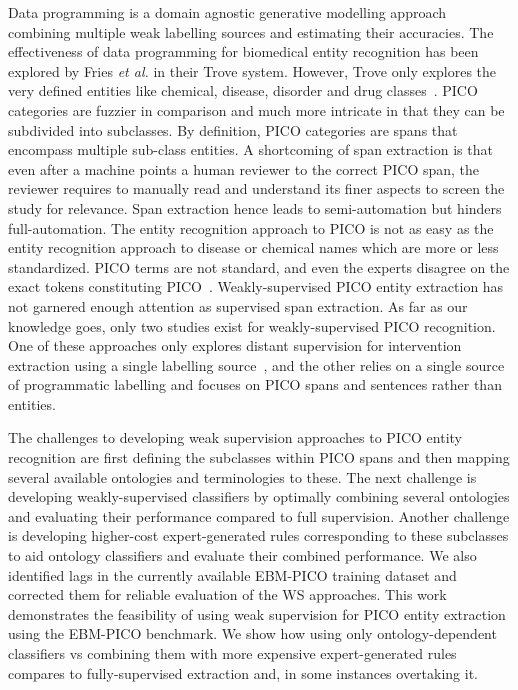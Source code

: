 \documentclass[10.7pt,]{article}
\begin{document}
Data programming is a domain agnostic generative modelling approach combining multiple weak labelling sources and estimating their accuracies.
The effectiveness of data programming for biomedical entity recognition has been explored by Fries \textit{et al.} in their Trove system.
However, Trove only explores the very defined entities like chemical, disease, disorder and drug classes~\cite{fries2021ontology}. 
PICO categories are fuzzier in comparison and much more intricate in that they can be subdivided into subclasses.
By definition, PICO categories are spans that encompass multiple sub-class entities.
A shortcoming of span extraction is that even after a machine points a human reviewer to the correct PICO span, the reviewer requires to manually read and understand its finer aspects to screen the study for relevance.
Span extraction hence leads to semi-automation but hinders full-automation.
The entity recognition approach to PICO is not as easy as the entity recognition approach to disease or chemical names which are more or less standardized.
PICO terms are not standard, and even the experts disagree on the exact tokens constituting PICO~\cite{brockmeier2019improving}.
Weakly-supervised PICO entity extraction has not garnered enough attention as supervised span extraction.
As far as our knowledge goes, only two studies exist for weakly-supervised PICO recognition.
One of these approaches only explores distant supervision for intervention extraction using a single labelling source~\cite{dhrangadhariya2022distant}, and the other relies on a single source of programmatic labelling and focuses on PICO spans and sentences rather than entities.



The challenges to developing weak supervision approaches to PICO entity recognition are first defining the subclasses within PICO spans and then mapping several available ontologies and terminologies to these.
The next challenge is developing weakly-supervised classifiers by optimally combining several ontologies and evaluating their performance compared to full supervision.
Another challenge is developing higher-cost expert-generated rules corresponding to these subclasses to aid ontology classifiers and evaluate their combined performance.
We also identified lags in the currently available EBM-PICO training dataset and corrected them for reliable evaluation of the WS approaches.
This work demonstrates the feasibility of using weak supervision for PICO entity extraction using the EBM-PICO benchmark.
We show how using only ontology-dependent classifiers vs combining them with more expensive expert-generated rules compares to fully-supervised extraction and, in some instances overtaking it.
%
%
%
\end{document}
